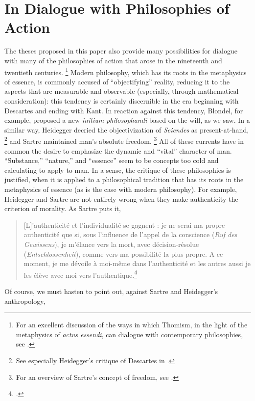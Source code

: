 \section{In Dialogue with Philosophies of Action}

The theses proposed in this paper also provide many possibilities for dialogue with many of the philosophies of action that arose in the nineteenth and twentieth centuries.%
\footnote{For an excellent discussion of the ways in which Thomism, in the light of the metaphysics of \emph{actus essendi}, can dialogue with contemporary philosophies, see \cite{clarke:thomism}.}
%
Modern philosophy, which has its roots in the metaphysics of essence, is commonly accused of “objectifying” reality, reducing it to the aspects that are measurable and observable (especially, through mathematical consideration): this tendency is certainly discernible in the era beginning with Descartes and ending with Kant. In reaction against this tendency, Blondel, for example, proposed a new \emph{initium philosophandi} based on the will, as we saw. In a similar way, Heidegger decried the objectivization of \emph{Seiendes} as present-at-hand,%
%
\footnote{See especially Heidegger’s critique of Descartes in \cite[89–101 (122–134 in the English translation)]{heidegger:being}.}
%
and Sartre maintained man’s absolute freedom.%
%
\footnote{For an overview of Sartre’s concept of freedom, see \cite[35–37]{lucas:orizzonte}.}
%
All of these currents have in common the desire to emphasize the dynamic and “vital” character of man. “Substance,” “nature,” and “essence” seem to be concepts too cold and calculating to apply to man. In a sense, the critique of these philosophies is justified, when it is applied to a philosophical tradition that has its roots in the metaphysics of essence (as is the case with modern philosophy).
%
For example, Heidegger and Sartre are not entirely wrong when they make  authenticity the criterion of morality. As Sartre puts it,
%
\begin{quotation}
[L]’authenti­cité et l’individualité se gagnent : je ne serai ma propre authenticité que si, sous l’influence de l’appel de la conscience (\emph{Ruf des Gewissens}), je m’élance vers la mort, avec décision-résolue (\emph{Entschlossenheit}), comme vers ma possibilité la plus propre. A ce moment, je me dévoile à moi-même dans l’authenticité et les autres aussi je les élève avec moi vers l’authentique.\footcite[285]{sartre:etre-et-neant}
\end{quotation}
%
Of course, we must hasten to point out, against Sartre and Heidegger’s anthropology,%
